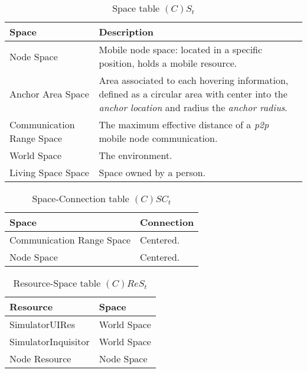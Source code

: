 \begin{table}[H]
	\centering
	\begin{tabular}{|p{4cm}|p{8cm}|}
			\hline
			\textbf{Space} & \textbf{Description} \\
			\hline
			Node Space & Mobile node space: located in a specific position, holds a
			mobile resource. \\
			\hline
			Anchor Area Space & Area associated to each hovering information, defined as a
			circular area with center into the \emph{anchor location} and radius the
			\emph{anchor radius}.\\
			\hline
			Communication Range Space & The maximum effective distance of a \emph{p2p}
			mobile node communication. \\
			\hline
			World Space & The environment. \\
			\hline
			Living Space Space & Space owned by a person. \\
			\hline
		\end{tabular}
	\caption{Space table $(C)S_t$}
	\label{tab:st}
\end{table}

\begin{table}[H]
	\centering
	\begin{tabular}{|p{4cm}|p{8cm}|}
			\hline
			\textbf{Space} & \textbf{Connection} \\
			\hline
			Communication Range Space & Centered. \\
			\hline
			Node Space & Centered. \\
			\hline
		\end{tabular}
	\caption{Space-Connection table $(C)SC_t$}
	\label{tab:sct}
\end{table}

\begin{table}[H]
	\centering
	\begin{tabular}{|p{4cm}|p{8cm}|}
			\hline
			\textbf{Resource} & \textbf{Space} \\
			\hline
			SimulatorUIRes & World Space \\
			\hline
			SimulatorInquisitor & World Space \\
			\hline
			Node Resource & Node Space \\
			\hline
		\end{tabular}
	\caption{Resource-Space table $(C)ReS_t$}
	\label{tab:crest}
\end{table}

